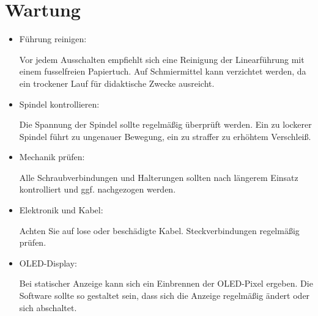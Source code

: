 \documentclass[a4paper,12pt]{report}
\begin{document}
	\chapter{Wartung}
	\begin{itemize}[leftmargin=1.5em]
		
		Der Demonstrator ist grundsätzlich wartungsarm. Dennoch sollten zur Sicherstellung der Lebensdauer und Funktionalität regelmäßig einige einfache Maßnahmen durchgeführt werden. \\[0,75cm]
		
		\textbf{Empfohlene Wartungsschritte:}
		
		\item Führung reinigen: 
		
		Vor jedem Ausschalten empfiehlt sich eine Reinigung der Linearführung mit einem fusselfreien Papiertuch. Auf Schmiermittel kann verzichtet werden, da ein trockener Lauf für didaktische Zwecke ausreicht. \\
		
		\item Spindel kontrollieren: 
		
		Die Spannung der Spindel sollte regelmäßig überprüft werden. Ein zu lockerer Spindel führt zu ungenauer Bewegung, ein zu straffer zu erhöhtem Verschleiß. \\
		
		\item Mechanik prüfen: 
		
		Alle Schraubverbindungen und Halterungen sollten nach längerem Einsatz kontrolliert und ggf. nachgezogen werden. \\
		
		\item Elektronik und Kabel: 
		
		Achten Sie auf lose oder beschädigte Kabel. Steckverbindungen regelmäßig prüfen. \\
		
		\item OLED-Display:
		
		Bei statischer Anzeige kann sich ein Einbrennen der OLED-Pixel ergeben. Die Software sollte so gestaltet sein, dass sich die Anzeige regelmäßig ändert oder sich abschaltet. \\
		
	\end{itemize}
	
\end{document}
